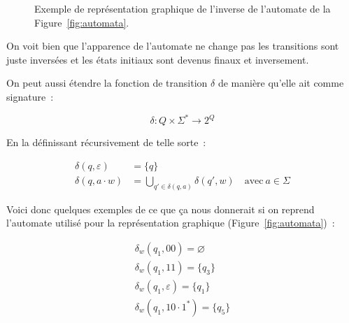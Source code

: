 \begin{figure}[H]
    \centering
    \captionsetup{type=figure,justification=centering}
    \caption{
        Exemple de représentation graphique de l'inverse de l'automate de la
        Figure~\ref{fig:automata}.
    }\label{fig:automata_invserse}
\end{figure}

On voit bien que l'apparence de l'automate ne change pas les transitions sont
juste inversées et les états initiaux sont devenus finaux et inversement.

\vphantom{}

On peut aussi étendre la fonction de transition \(\delta\) de manière qu'elle
ait comme signature~:

\[
    \delta: Q \times \Sigma^* \to 2^Q
\]

En la définissant récursivement de telle sorte~:

\begin{align*}
    \delta(q, \varepsilon) & = \{q\}                                                                       \\
    \delta(q, a \cdot w)   & = \bigcup_{q' \in \delta(q, a)} \delta(q', w) \quad \text{avec}~ a \in \Sigma
\end{align*}

\begin{example}
    Voici donc quelques exemples de ce que ça nous donnerait si on reprend
    l'automate utilisé pour la représentation graphique
    (Figure~\ref{fig:automata})~:

    \begin{gather*}
        \delta_w(q_1, 00) = \varnothing \\
        \delta_w(q_1, 11) = \{q_3\} \\
        \delta_w(q_1, \varepsilon) = \{q_1\} \\
        \delta_w(q_1, 10 \cdot 1^*) = \{q_5\}
    \end{gather*}
\end{example}

